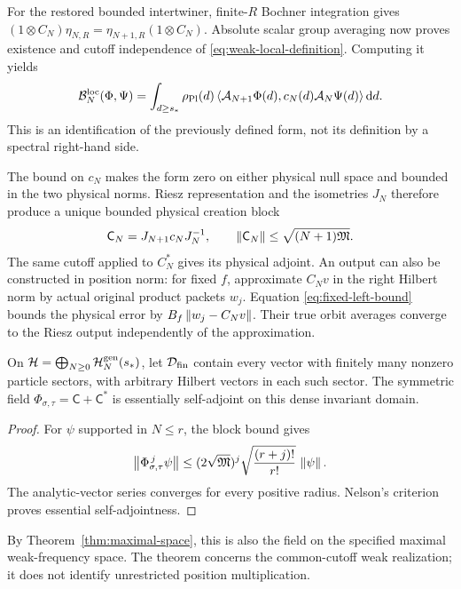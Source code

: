 For the restored bounded intertwiner, finite-$R$ Bochner integration gives
$(1\otimes C_N)\eta_{N,R}=\eta_{N+1,R}(1\otimes C_N)$.
Absolute scalar group averaging now proves existence and cutoff
independence of \eqref{eq:weak-local-definition}. Computing it yields
\begin{equation}
 \mathcal B_N^{\mathrm{loc}}(\Phi,\Psi)
 =\int_{d\ge s_*}\rho_{\mathrm{Pl}}(d)
   \left\langle\mathcal A_{N+1}\Phi(d),c_N(d)\mathcal A_N\Psi(d)\right\rangle\mathop{}\!\mathrm d d.
 \label{eq:weak-local-identified}
\end{equation}
This is an identification of the previously defined form, not its
definition by a spectral right-hand side.

The bound on $c_N$ makes the form zero on either physical null space and
bounded in the two physical norms. Riesz representation and the isometries
$J_N$ therefore produce a unique bounded physical creation block
\begin{equation}
 \mathsf C_N=J_{N+1}c_NJ_N^{-1},\qquad
 \left\lVert\mathsf C_N\right\rVert\le\sqrt{(N+1)\mathfrak M}.
 \label{eq:physical-creation}
\end{equation}
The same cutoff applied to $C_N^*$ gives its physical adjoint.
An output can also be constructed in position norm: for fixed $f$,
approximate $C_Nv$ in the right Hilbert norm by actual original product
packets $w_j$. Equation \eqref{eq:fixed-left-bound} bounds the physical
error by $B_f\left\lVert w_j-C_Nv\right\rVert$. Their true orbit averages converge to
the Riesz output independently of the approximation.

\begin{theorem}
On $\mathcal H=\bigoplus_{N\ge0}\mathcal H_N^{\mathrm{gen}}(s_*)$, let $\mathcal D_{\mathrm{fin}}$
contain every vector with finitely many nonzero particle sectors, with
arbitrary Hilbert vectors in each such sector. The symmetric field
$\Phi_{\sigma,\tau}=\mathsf C+\mathsf C^*$ is essentially self-adjoint
on this dense invariant domain.
\label{thm:field}
\end{theorem}
\begin{proof}
For $\psi$ supported in $N\le r$, the block bound gives
\begin{equation}
 \left\lVert\Phi_{\sigma,\tau}^{\,j}\psi\right\rVert
 \le(2\sqrt{\mathfrak M})^j
      \sqrt{\frac{(r+j)!}{r!}}\,\left\lVert\psi\right\rVert.
\end{equation}
The analytic-vector series converges for every positive radius. Nelson's
criterion~\cite{Nelson} proves essential self-adjointness.
\end{proof}

By Theorem~\ref{thm:maximal-space}, this is also the field on the specified
maximal weak-frequency space. The theorem concerns the common-cutoff weak
realization; it does not identify unrestricted position multiplication.
